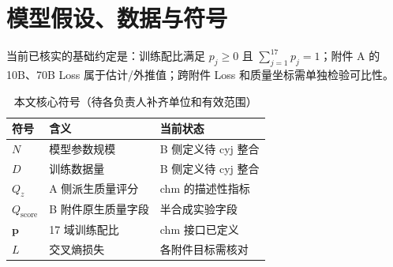 \section{模型假设、数据与符号}
当前已核实的基础约定是：训练配比满足 $p_j\geq0$ 且 $\sum_{j=1}^{17}p_j=1$；附件 A 的 10B、70B Loss 属于估计/外推值；跨附件 Loss 和质量坐标需单独检验可比性。

\begin{table}[htbp]
\centering
\caption{本文核心符号（待各负责人补齐单位和有效范围）}
\begin{tabular}{lll}
\toprule
符号 & 含义 & 当前状态 \\
\midrule
$N$ & 模型参数规模 & B 侧定义待 cyj 整合 \\
$D$ & 训练数据量 & B 侧定义待 cyj 整合 \\
$Q_z$ & A 侧派生质量评分 & chm 的描述性指标 \\
$Q_{\mathrm{score}}$ & B 附件原生质量字段 & 半合成实验字段 \\
$\boldsymbol p$ & 17 域训练配比 & chm 接口已定义 \\
$L$ & 交叉熵损失 & 各附件目标需核对 \\
\bottomrule
\end{tabular}
\end{table}

